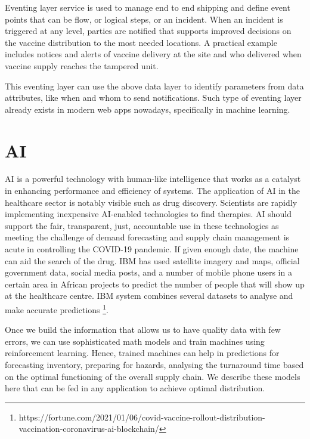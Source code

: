\documentclass{article}
\begin{document}
Eventing layer service is used to manage end to end shipping and define event points that can be flow, or logical steps, or an incident. When an incident is triggered at any level, parties are notified that supports improved decisions on the vaccine distribution to the most needed locations. A practical example includes notices and alerts of vaccine delivery at the site and who delivered when vaccine supply reaches the tampered unit.

This eventing layer can use the above data layer to identify parameters from data attributes, like when and whom to send notifications. Such type of eventing layer already exists in modern web apps nowadays, specifically in machine learning.    

\section{AI}
AI is a powerful technology with human-like intelligence that works as a catalyst in enhancing performance and efficiency of systems. The application of AI in the healthcare sector is notably visible such as drug discovery. Scientists are rapidly implementing inexpensive AI-enabled technologies to find therapies. AI should support the fair, transparent, just, accountable use in these technologies as meeting the challenge of demand forecasting and supply chain management is acute in controlling the COVID-19 pandemic. If given enough date, the machine can aid the search of the drug\cite{keshavarzi2020artificial}. IBM has used satellite imagery and maps, official government data, social media posts, and a number of mobile phone users in a certain area in African projects to predict the number of people that will show up at the healthcare centre. IBM system combines several datasets to analyse and make accurate predictions \footnote{https://fortune.com/2021/01/06/covid-vaccine-rollout-distribution-vaccination-coronavirus-ai-blockchain/}.  

Once we build the information that allows us to have quality data with few errors, we can use sophisticated math models and train machines using reinforcement learning. Hence, trained machines can help in predictions for forecasting inventory, preparing for hazards, analysing the turnaround time based on the optimal functioning of the overall supply chain. We describe these models here that can be fed in any application to achieve optimal distribution.
\end{document}
